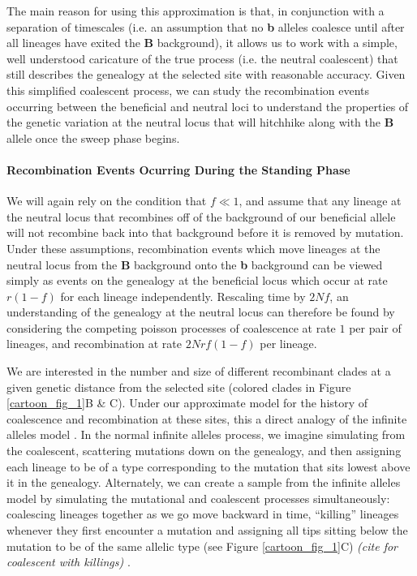\documentclass[a4paper,10pt]{article}
\newcommand{\jb}[1]{{\it\color{blue} (#1)} }
\begin{document}
The main reason for using this approximation is that, in conjunction with a separation of timescales (i.e. an assumption that no \textbf{b} alleles coalesce until after all lineages have exited the \textbf{B} background), it allows us to work with a simple, well understood caricature of the true process (i.e. the neutral coalescent) that still describes the genealogy at the selected site with reasonable accuracy. Given this simplified coalescent process, we can study the recombination events occurring between the beneficial and neutral loci to understand the properties of the genetic variation at the neutral locus that will hitchhike along with the \textbf{B} allele once the sweep phase begins.

\paragraph{Recombination Events Ocurring During the Standing Phase}

We will again rely on the condition that $f \ll 1$, and assume that any lineage at the neutral locus that recombines off of the background of our beneficial allele will not recombine back into that background before it is removed by mutation. Under these assumptions, recombination events which move lineages at the neutral locus from the \textbf{B} background onto the \textbf{b} background can be viewed simply as events on the genealogy at the beneficial locus which occur at rate $r\left(1-f\right)$ for each lineage independently. Rescaling time by $2Nf$, an understanding of the genealogy at the neutral locus can therefore be found by considering the competing poisson processes of coalescence at rate $1$ per pair of lineages, and recombination at rate $2Nrf(1-f)$ per lineage.

We are interested in the number and size of different recombinant clades at a given genetic distance from the selected site (colored clades in Figure \ref{cartoon_fig_1}B \& C). Under our approximate model for the history of coalescence and recombination at these sites, this a direct analogy of the infinite alleles model \citep{}. In the normal infinite alleles process, we imagine simulating from the coalescent, scattering mutations down on the genealogy, and then assigning each lineage to be of a type corresponding to the mutation that sits lowest above it in the genealogy. Alternately, we can create a sample from the infinite alleles model by simulating the mutational and coalescent processes simultaneously: coalescing lineages together as we go move backward in time, ``killing'' lineages whenever they first encounter a mutation and assigning all tips sitting below the mutation to be of the same allelic type (see Figure \ref{cartoon_fig_1}C) \jb{cite for coalescent with killings}.
\end{document}
